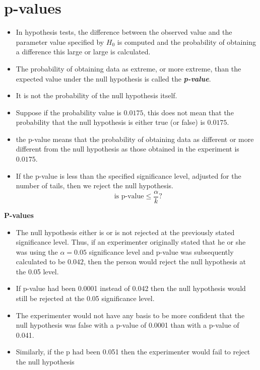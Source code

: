 \documentclass[]{report}
\begin{document}
	\section{p-values}
	\begin{itemize}
		\item In hypothesis tests, the difference between the observed value and the parameter value specified by $H_0$ is computed and the probability of obtaining a difference this large or large is calculated.
		\item The probability of obtaining data as extreme, or more extreme, than the expected value under the null hypothesis is called the \textbf{\emph{p-value}}.
		\item It is not the probability of the null hypothesis itself.
		\item Suppose if the probability value is $0.0175$, this does not mean that the probability that the null hypothesis is either true (or false) is $0.0175$.
		
		
		\item the p-value means that the probability of obtaining data as different or more different from the null hypothesis as those obtained in the experiment is $0.0175$.
		\item If the p-value is less than the specified significance level, adjusted for the number of tails, then we reject the null hypothesis.
		\[\mbox{ is p-value} \leq \frac{\alpha}{k} \mbox{?}\]
	\end{itemize}
	
	
	
	
	\textbf{P-values}
	
	\begin{itemize}
		\item The null hypothesis either is or is not rejected at the previously stated significance level. Thus, if an experimenter originally stated that he or she was using the $\alpha = 0.05$ significance level and p-value was subsequently calculated to be $0.042$, then the person would reject the null hypothesis at the 0.05 level. \item If p-value had been 0.0001 instead of 0.042 then the null hypothesis would still be rejected at the 0.05 significance level.  \item
		The experimenter would not have any basis to be more confident that the null hypothesis was false with a p-value of 0.0001 than with a p-value of 0.041. \item Similarly, if the p had been 0.051 then the experimenter would fail to reject the null hypothesis
	\end{itemize}
	
\end{document}
